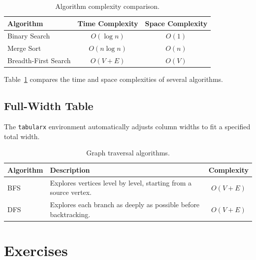 \documentclass{csdept}
\begin{document}
\begin{table}[htbp]
    \centering
    \caption{Algorithm complexity comparison.}
    \label{tab:complexity}

    \begin{tabular}{lcc}
        \toprule
        Algorithm & Time Complexity & Space Complexity \\
        \midrule
        Binary Search & $O(\log n)$ & $O(1)$ \\
        Merge Sort    & $O(n\log n)$ & $O(n)$ \\
        Breadth-First Search & $O(V+E)$ & $O(V)$ \\
        \bottomrule
    \end{tabular}
\end{table}

Table~\ref{tab:complexity} compares the time and space
complexities of several algorithms.

\subsection{Full-Width Table}

The \texttt{tabularx} environment automatically adjusts column
widths to fit a specified total width.

\begin{table}[htbp]
    \centering
    \caption{Graph traversal algorithms.}
    \label{tab:traversal}

    \begin{tabularx}{\textwidth}{lXc}
        \toprule
        Algorithm & Description & Complexity \\
        \midrule
        BFS &
        Explores vertices level by level, starting from a source
        vertex. &
        $O(V+E)$ \\

        DFS &
        Explores each branch as deeply as possible before
        backtracking. &
        $O(V+E)$ \\
        \bottomrule
    \end{tabularx}
\end{table}



\section{Exercises}
\end{document}

